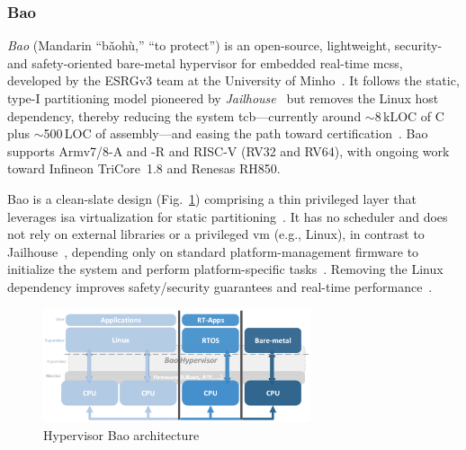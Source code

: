 \subsubsection{Bao}%
\label{sec:bao}
\emph{Bao} (Mandarin “bǎohù,” “to protect”) is an open-source, lightweight,
security- and safety-oriented bare-metal hypervisor for embedded real-time
\glspl{mcs}, developed by the ESRGv3 team at the University of
Minho~\cite{martins_et_al:OASIcs:2020:11779,baoRepo}. It follows the static,
type-I partitioning model pioneered by \emph{Jailhouse}~\cite{jailhouse} but
removes the Linux host dependency, thereby reducing the system
\gls{tcb}—currently around $\sim$8\,kLOC of C plus $\sim$500\,LOC of
assembly—and easing the path toward
certification~\cite{martins_et_al:OASIcs:2020:11779}. Bao supports Armv7/8-A and
-R and RISC-V (RV32 and RV64), with ongoing work toward Infineon TriCore~1.8 and
Renesas RH850.

Bao is a clean-slate design (Fig.~\ref{fig:bao-arch}) comprising a thin
privileged layer that leverages \gls{isa} virtualization for static
partitioning~\cite{martins_et_al:OASIcs:2020:11779}. It has no scheduler and
does not rely on external libraries or a privileged \gls{vm} (e.g., Linux), in
contrast to Jailhouse~\cite{jailhouse}, depending only on standard
platform-management firmware to initialize the system and perform
platform-specific tasks~\cite{martins_et_al:OASIcs:2020:11779}. Removing the
Linux dependency improves safety/security guarantees and real-time
performance~\cite{martins_et_al:OASIcs:2020:11779}.

\begin{figure}[!hbtp]
  \centering
  \includegraphics[width=0.7\textwidth]{./img/png/bao-arch}
  \caption[Hypervisor Bao architecture]{Hypervisor Bao architecture~\cite{martins_et_al:OASIcs:2020:11779}\footnotemark}%
  \label{fig:bao-arch}
\end{figure}
%

